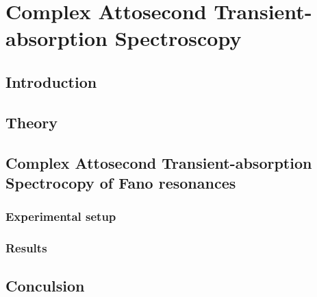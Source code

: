 \chapter{Complex Attosecond Transient-absorption Spectroscopy}
\label{chap:CATS}

\section{Introduction}
\label{sec:intro_cats}

\section{Theory}
\label{sec:ats_theory}


\section{Complex Attosecond Transient-absorption Spectrocopy of Fano resonances}
\label{sec:CATS_ar}

\subsection{Experimental setup}
\label{sec:CATS_ar_exp_setup}

\subsection{Results}
\label{sec:CATS_ar_results}


\section{Conculsion}
\label{sec:CATS_conclusion}